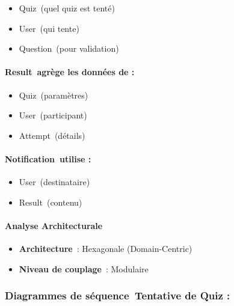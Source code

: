 \documentclass[12pt,a4paper,twoside,openright]{report}
\begin{document}
\begin{itemize}
\item
  Quiz~(quel quiz est tenté)
\item
  User~(qui tente)
\item
  Question~(pour validation)
\end{itemize}

\hypertarget{result-agruxe8ge-les-donnuxe9es-de}{%
\paragraph{Result~agrège les données de
:}\label{result-agruxe8ge-les-donnuxe9es-de}}

\begin{itemize}
\item
  Quiz~(paramètres)
\item
  User~(participant)
\item
  Attempt~(détails)
\end{itemize}

\hypertarget{notification-utilise}{%
\paragraph{Notification~utilise :}\label{notification-utilise}}

\begin{itemize}
\item
  User~(destinataire)
\item
  Result~(contenu)
\end{itemize}

\hypertarget{analyse-architecturale}{%
\paragraph{Analyse Architecturale}\label{analyse-architecturale}}

\begin{itemize}
\item
  \textbf{Architecture}~: Hexagonale (Domain-Centric)
\item
  \textbf{Niveau de couplage}~: Modulaire
\end{itemize}

\hypertarget{diagrammes-de-suxe9quence-tentative-de-quiz}{%
\subsubsection{Diagrammes de séquence~Tentative de Quiz
:}\label{diagrammes-de-suxe9quence-tentative-de-quiz}}
\end{document}
